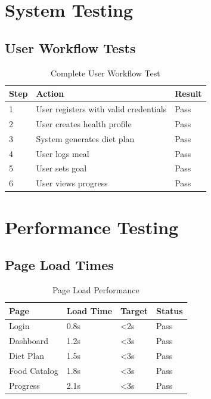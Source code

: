\section{System Testing}

\subsection{User Workflow Tests}

\begin{table}[H]
\centering
\begin{tabular}{|l|p{8cm}|l|}
\hline
\textbf{Step} & \textbf{Action} & \textbf{Result} \\
\hline
1 & User registers with valid credentials & Pass \\
2 & User creates health profile & Pass \\
3 & System generates diet plan & Pass \\
4 & User logs meal & Pass \\
5 & User sets goal & Pass \\
6 & User views progress & Pass \\
\hline
\end{tabular}
\caption{Complete User Workflow Test}
\end{table}

\section{Performance Testing}

\subsection{Page Load Times}

\begin{table}[H]
\centering
\begin{tabular}{|l|l|l|l|}
\hline
\textbf{Page} & \textbf{Load Time} & \textbf{Target} & \textbf{Status} \\
\hline
Login & 0.8s & <2s & Pass \\
Dashboard & 1.2s & <3s & Pass \\
Diet Plan & 1.5s & <3s & Pass \\
Food Catalog & 1.8s & <3s & Pass \\
Progress & 2.1s & <3s & Pass \\
\hline
\end{tabular}
\caption{Page Load Performance}
\end{table}

